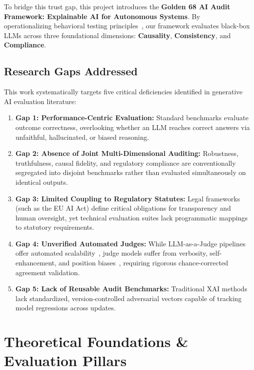 \documentclass[conference]{IEEEtran}
\begin{document}
To bridge this trust gap, this project introduces the \textbf{Golden 68 AI Audit Framework: Explainable AI for Autonomous Systems}. By operationalizing behavioral testing principles~\cite{ribeiro2020checklist}, our framework evaluates black-box LLMs across three foundational dimensions: \textbf{Causality}, \textbf{Consistency}, and \textbf{Compliance}.

\subsection{Research Gaps Addressed}
This work systematically targets five critical deficiencies identified in generative AI evaluation literature:
\begin{enumerate}
    \item \textbf{Gap 1: Performance-Centric Evaluation:} Standard benchmarks evaluate outcome correctness, overlooking whether an LLM reaches correct answers via unfaithful, hallucinated, or biased reasoning.
    \item \textbf{Gap 2: Absence of Joint Multi-Dimensional Auditing:} Robustness, truthfulness, causal fidelity, and regulatory compliance are conventionally segregated into disjoint benchmarks rather than evaluated simultaneously on identical outputs.
    \item \textbf{Gap 3: Limited Coupling to Regulatory Statutes:} Legal frameworks (such as the EU AI Act) define critical obligations for transparency and human oversight, yet technical evaluation suites lack programmatic mappings to statutory requirements.
    \item \textbf{Gap 4: Unverified Automated Judges:} While LLM-as-a-Judge pipelines offer automated scalability~\cite{zheng2023judging}, judge models suffer from verbosity, self-enhancement, and position biases~\cite{wang2024large}, requiring rigorous chance-corrected agreement validation.
    \item \textbf{Gap 5: Lack of Reusable Audit Benchmarks:} Traditional XAI methods lack standardized, version-controlled adversarial vectors capable of tracking model regressions across updates.
\end{enumerate}

\section{Theoretical Foundations \& Evaluation Pillars}
\label{sec:theoretical_foundations}
\end{document}
